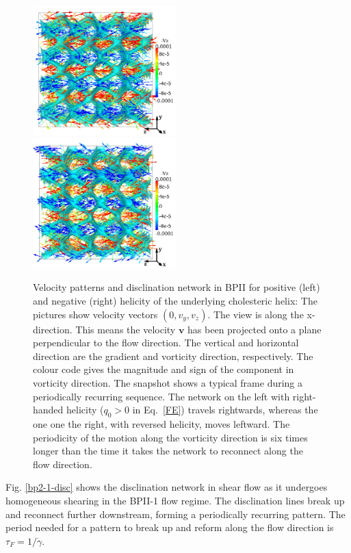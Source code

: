 \documentclass[8.5pt,twoside,twocolumn]{article}
\newcommand{\gd}{\dot{\gamma}}
\begin{document}
\begin{figure}[htbp]
\includegraphics[width=0.495\textwidth]{v_yz-v_z-160k_run902r.png}
\includegraphics[width=0.495\textwidth]{v_yz-v_z-160k_run903r.png}
\caption{Velocity patterns and disclination network in BPII for positive (left) and negative (right) helicity of the 
underlying cholesteric helix: The pictures show velocity vectors $(0,v_y,v_z)$.
The view is along the x-direction. This means the velocity ${\mathbf v}$ 
has been projected onto a plane perpendicular to the flow direction. 
The vertical and horizontal direction are the gradient and vorticity direction, respectively.
The colour code gives the magnitude and sign of the component in vorticity direction.
The snapshot shows a typical frame during a periodically recurring sequence.
The network on the left with right-handed helicity ($q_0>0$ in Eq.~\ref{FE}) travels rightwards, whereas the one one the right,
with reversed helicity, moves leftward. 
The periodicity of the motion along the vorticity direction is six times longer than the time 
it takes the network to reconnect along the flow direction.}
\label{bp2-1-velo}
\end{figure}


Fig. \ref{bp2-1-disc} shows the disclination network in shear flow as
it undergoes homogeneous shearing in the BPII-1 flow regime. 
The disclination lines break up and 
reconnect further downstream, forming a periodically recurring pattern. The
period needed for a pattern to break up and 
reform along the flow direction is $\tau_F = 1/\gd$.
\end{document}
